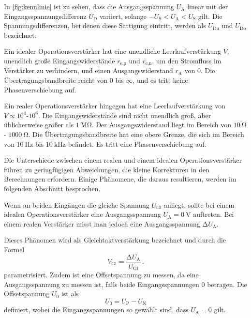 In \autoref{fig:kennlinie} ist zu sehen, dass die Ausgangsspannung $U_\text{A}$ linear mit der Eingangsspannungsdifferenz $U_\text{D}$ variiert, solange $- U_\text{S} < U_\text{A} < U_\text{S}$ gilt. Die Spannungsdifferenzen, bei denen diese Sättigung eintritt, werden als $U_\text{Du}$ und $U_\text{Do}$ bezeichnet.

Ein idealer Operationsverstärker hat eine unendliche Leerlaufverstärkung $V$, unendlich große Eingangswiderstände $r_\text{e,p}$ und $r_\text{e,n}$, um den Stromfluss im Verstärker zu verhindern, und einen Ausgangswiderstand $r_\text{A}$ von $0$. Die Übertragungsbandbreite reicht von $0$ bis $\infty$, und es tritt keine Phasenverschiebung auf.

Ein realer Operationsverstärker hingegen hat eine Leerlaufverstärkung von $V \propto 10^4$-$10^6$. Die Eingangswiderstände sind nicht unendlich groß, aber üblicherweise größer als $\SI{1}{\mega\ohm}$. Der Ausgangswiderstand liegt im Bereich von $\SI{10}{\ohm}$ - $\SI{1000}{\ohm}$. Die Übertragungsbandbreite hat eine obere Grenze, die sich im Bereich von $\SI{10}{\hertz}$ bis $\SI{10}{\kilo\hertz}$ befindet. Es tritt eine Phasenverschiebung auf.

Die Unterschiede zwischen einem realen und einem idealen Operationsverstärker führen zu geringfügigen Abweichungen, die kleine Korrekturen in den Berechnungen erfordern. Einige Phänomene, die daraus resultieren, werden im folgenden Abschnitt besprochen.

\noindent 
Wenn an beiden Eingängen die gleiche Spannung $U_\text{Gl}$ anliegt, sollte bei einem idealen Operationsverstärker eine Ausgangsspannung $U_\text{A} = \SI{0}{\volt}$ auftreten. Bei einem realen Verstärker misst man jedoch eine Ausgangsspannung $\increment U_\text{A}$.

Dieses Phänomen wird als Gleichtaktverstärkung bezeichnet und durch die Formel
\begin{equation}
    V_\text{Gl} = \frac{\increment U_\text{A}}{U_\text{Gl}}\, .
    \label{eqn:verstaerkung}
\end{equation}
parametrisiert. Zudem ist eine Offsetspannung zu messen, da eine Ausgangsspannung zu messen ist, falls beide Eingangsspannungen $0$ betragen. Die Offsetspannung $U_0$ ist als 
\begin{equation*}
    U_0 = U_\text{P} - U_\text{N}
\end{equation*}
definiert, wobei die Eingangsspannungen so gewählt sind, dass $U_\text{A}=0$ gilt.


